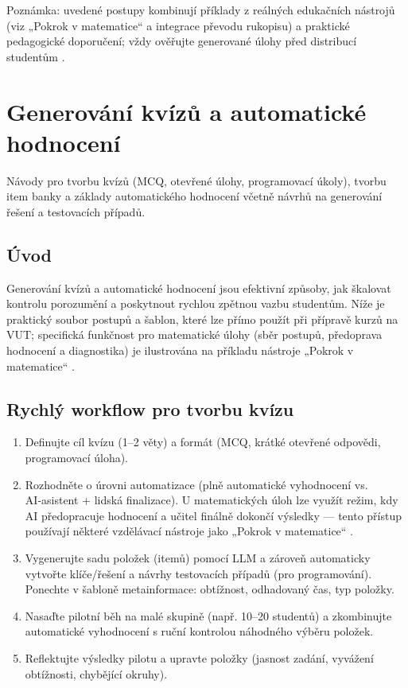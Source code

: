\documentclass{report}%
\begin{document}
\medskip
Poznámka: uvedené postupy kombinují příklady z reálných edukačních nástrojů (viz „Pokrok v matematice“ a integrace převodu rukopisu) a praktické pedagogické doporučení; vždy ověřujte generované úlohy před distribucí studentům \cite{kb_ai_101_tipu_pdf_04e4a115_page_8_1, kb_ai_101_tipu_pdf_04e4a115_page_14_1, kb_ai_101_tipu_pdf_04e4a115_page_15_2}.%

%
\section{Generování kvízů a automatické hodnocení}%
Návody pro tvorbu kvízů (MCQ, otevřené úlohy, programovací úkoly), tvorbu item banky a základy automatického hodnocení včetně návrhů na generování řešení a testovacích případů.%


%
\subsection*{Úvod}
Generování kvízů a automatické hodnocení jsou efektivní způsoby, jak škalovat kontrolu porozumění a poskytnout rychlou zpětnou vazbu studentům. Níže je praktický soubor postupů a šablon, které lze přímo použít při přípravě kurzů na VUT; specifická funkčnost pro matematické úlohy (sběr postupů, předoprava hodnocení a diagnostika) je ilustrována na příkladu nástroje „Pokrok v matematice“ \cite{kb_ai_101_tipu_pdf_04e4a115_page_8_1}.

\subsection*{Rychlý workflow pro tvorbu kvízu}
\begin{enumerate}
  \item Definujte cíl kvízu (1–2 věty) a formát (MCQ, krátké otevřené odpovědi, programovací úloha).
  \item Rozhodněte o úrovni automatizace (plně automatické vyhodnocení vs. AI‑asistent + lidská finalizace). U matematických úloh lze využít režim, kdy AI předopracuje hodnocení a učitel finálně dokončí výsledky — tento přístup používají některé vzdělávací nástroje jako „Pokrok v matematice“ \cite{kb_ai_101_tipu_pdf_04e4a115_page_8_1}.
  \item Vygenerujte sadu položek (itemů) pomocí LLM a zároveň automaticky vytvořte klíče/řešení a návrhy testovacích případů (pro programování). Ponechte v šabloně metainformace: obtížnost, odhadovaný čas, typ položky.
  \item Nasaďte pilotní běh na malé skupině (např. 10–20 studentů) a zkombinujte automatické vyhodnocení s ruční kontrolou náhodného výběru položek.
  \item Reflektujte výsledky pilotu a upravte položky (jasnost zadání, vyvážení obtížnosti, chybějící okruhy).
\end{enumerate}
\end{document}
